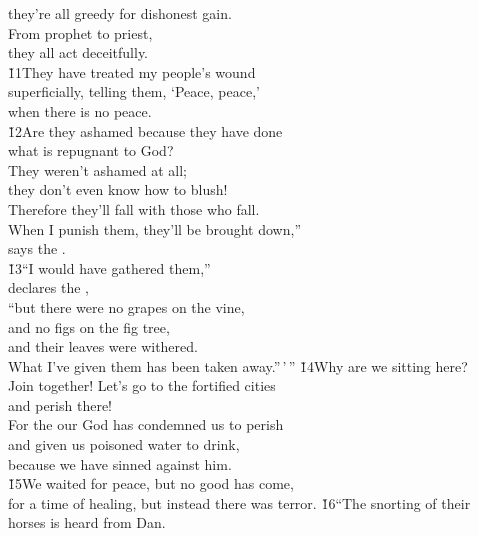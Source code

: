 \begin{poetry}
\poemll    they're all greedy for dishonest gain. \\
\poeml From prophet to priest, \\
\poemll    they all act deceitfully. \\
\poeml \v{11}They have treated my people's wound \\
\poemll    superficially, telling them, `Peace, peace,' \\
\poemlll       when there is no peace. \\
\poeml \v{12}Are they ashamed because they have done \\
\poemll    what is repugnant to God? \\
\poeml They weren't ashamed at all; \\
\poemll    they don't even know how to blush! \\
\poeml Therefore they'll fall with those who fall. \\
\poemll    When I punish them, they'll be brought down,'' \\
\poemlll       says the . \\
\poeml \v{13}``I would have gathered them,'' \\
\poemll    declares the , \\
\poeml ``but there were no grapes on the vine, \\
\poemll    and no figs on the fig tree, \\
\poeml and their leaves were withered. \\
\poemll    What I've given them has been taken away.''\,'\,''
\poeml \v{14}Why are we sitting here? \\
\poemll    Join together! Let's go to the fortified cities \\
\poemlll       and perish there! \\
\poeml For the  our God has condemned us to perish \\
\poemll    and given us poisoned water to drink, \\
\poemlll       because we have sinned against him. \\
\poeml \v{15}We waited for peace, but no good has come, \\
\poemll    for a time of healing, but instead there was terror.
\poeml \v{16}``The snorting of their horses is heard from Dan. \\

\end{poetry}
